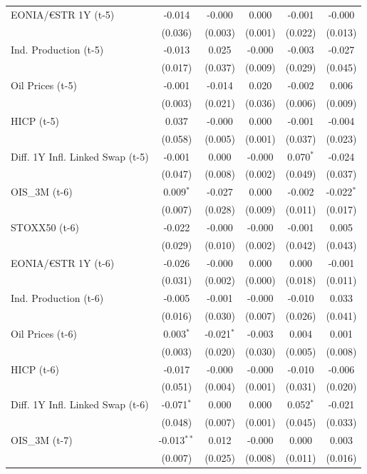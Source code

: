 \begin{longtable}[t]{lccccc}
EONIA/€STR 1Y (t-5) & -0.014 & -0.000 & 0.000 & -0.001 & -0.000\\
 & (0.036) & (0.003) & (0.001) & (0.022) & (0.013)\\
Ind. Production (t-5) & -0.013 & 0.025 & -0.000 & -0.003 & -0.027\\
 & (0.017) & (0.037) & (0.009) & (0.029) & (0.045)\\
Oil Prices (t-5) & -0.001 & -0.014 & 0.020 & -0.002 & 0.006\\
 & (0.003) & (0.021) & (0.036) & (0.006) & (0.009)\\
HICP (t-5) & 0.037 & -0.000 & 0.000 & -0.001 & -0.004\\
 & (0.058) & (0.005) & (0.001) & (0.037) & (0.023)\\
Diff. 1Y Infl. Linked Swap (t-5) & -0.001 & 0.000 & -0.000 & 0.070$^{*}$ & -0.024\\
 & (0.047) & (0.008) & (0.002) & (0.049) & (0.037)\\
OIS\_3M (t-6) & 0.009$^{*}$ & -0.027 & 0.000 & -0.002 & -0.022$^{*}$\\
 & (0.007) & (0.028) & (0.009) & (0.011) & (0.017)\\
STOXX50 (t-6) & -0.022 & -0.000 & -0.000 & -0.001 & 0.005\\
 & (0.029) & (0.010) & (0.002) & (0.042) & (0.043)\\
EONIA/€STR 1Y (t-6) & -0.026 & -0.000 & 0.000 & 0.000 & -0.001\\
 & (0.031) & (0.002) & (0.000) & (0.018) & (0.011)\\
Ind. Production (t-6) & -0.005 & -0.001 & -0.000 & -0.010 & 0.033\\
 & (0.016) & (0.030) & (0.007) & (0.026) & (0.041)\\
Oil Prices (t-6) & 0.003$^{*}$ & -0.021$^{*}$ & -0.003 & 0.004 & 0.001\\
 & (0.003) & (0.020) & (0.030) & (0.005) & (0.008)\\
HICP (t-6) & -0.017 & -0.000 & -0.000 & -0.010 & -0.006\\
 & (0.051) & (0.004) & (0.001) & (0.031) & (0.020)\\
Diff. 1Y Infl. Linked Swap (t-6) & -0.071$^{*}$ & 0.000 & 0.000 & 0.052$^{*}$ & -0.021\\
 & (0.048) & (0.007) & (0.001) & (0.045) & (0.033)\\
OIS\_3M (t-7) & -0.013$^{**}$ & 0.012 & -0.000 & 0.000 & 0.003\\
 & (0.007) & (0.025) & (0.008) & (0.011) & (0.016)\\

\end{longtable}
